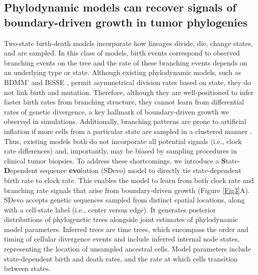 \documentclass[12pt]{elife_based}
\begin{document}
\subsection*{Phylodynamic models can recover signals of boundary-driven growth in tumor phylogenies}
Two-state birth-death models incorporate how lineages divide, die, change states, and are sampled. In this class of models, birth events correspond to observed branching events on the tree and the rate of these branching events depends on an underlying type or state. Although existing phylodynamic models, such as BDMM'\citep{Kuhnert:2016vv, Vaughan2022} and BiSSE \citep{Maddison2007a}, permit asymmetrical division rates based on state, they do not link birth and mutation. 
Therefore, although they are well-positioned to infer faster birth rates from branching structure, they cannot learn from differential rates of genetic divergence, a key hallmark of boundary-driven growth we observed in simulations. Additionally, branching patterns are prone to artificial inflation if more cells from a particular state are sampled in a clustered manner \citep{Hohna2011_sampling}. Thus, existing models both do not incorporate all potential signals (i.e., clock rate differences) and, importantly, may be biased by sampling procedures in clinical tumor biopsies. To address these shortcomings, we introduce a \textbf{S}tate-\textbf{D}ependent sequence \textbf{evo}lution (SDevo) model to directly tie state-dependent birth rate to clock rate. This enables the model to learn from both clock rate and branching rate signals that arise from boundary-driven growth (Figure \ref{Fig3}A). SDevo accepts genetic sequences sampled from distinct spatial locations, along with a cell-state label (i.e., center versus edge). It generates posterior distributions of phylogenetic trees alongside joint estimates of phylodynamic model parameters. Inferred trees are time trees, which encompass the order and timing of cellular divergence events and include inferred internal node states, representing the location of unsampled ancestral cells. Model parameters include state-dependent birth and death rates, and the rate at which cells transition between states.
\end{document}

